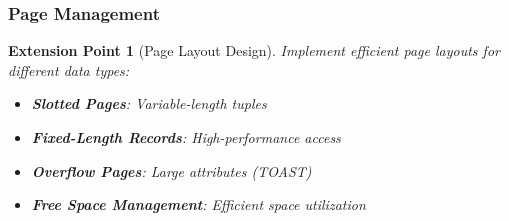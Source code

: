 \documentclass[12pt,a4paper]{article}
\newtheorem{extension}{Extension Point}[section]
\begin{document}
    \subsubsection{Page Management}

    \begin{extension}[Page Layout Design]
        Implement efficient page layouts for different data types:

        \begin{itemize}
            \item \textbf{Slotted Pages}: Variable-length tuples
            \item \textbf{Fixed-Length Records}: High-performance access
            \item \textbf{Overflow Pages}: Large attributes (TOAST)
            \item \textbf{Free Space Management}: Efficient space utilization
        \end{itemize}
    \end{extension}
\end{document}
